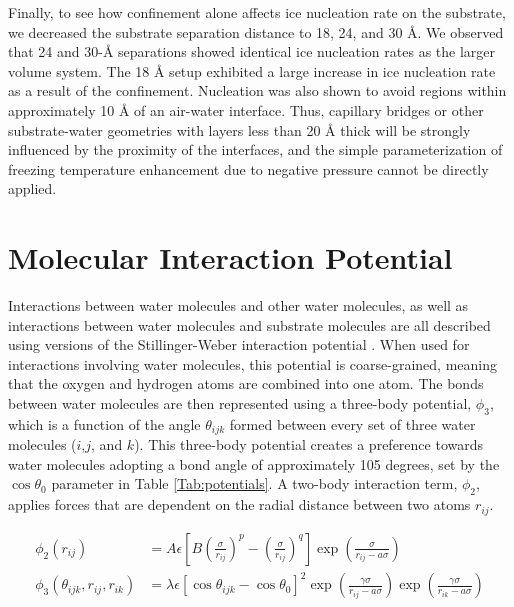 \documentclass[journal abbreviation, manuscript]{copernicus}
\begin{document}
Finally, to see how confinement alone affects ice nucleation rate on the substrate, we decreased the substrate separation distance to 18, 24, and 30 \AA{}. We observed that 24 and 30-\AA{} separations showed identical ice nucleation rates as the larger volume system. The 18 \AA{} setup exhibited a large increase in ice nucleation rate as a result of the confinement. Nucleation was also shown to avoid regions within approximately 10 \AA{} of an air-water interface. Thus, capillary bridges or other substrate-water geometries with layers less than 20 \AA{} thick will be strongly influenced by the proximity of the interfaces, and the simple parameterization of freezing temperature enhancement due to negative pressure cannot be directly applied.


\appendix
\section{Molecular Interaction Potential}\label{app: potential} 

Interactions between water molecules and other water molecules, as well as interactions between water molecules and substrate molecules are all described using versions of the Stillinger-Weber interaction potential \citep{stillinger1985computer}. When used for interactions involving water molecules, this potential is coarse-grained, meaning that the oxygen and hydrogen atoms are combined into one atom. The bonds between water molecules are then represented using a three-body potential, $\phi_{3}$, which is a function of the angle $\theta_{ijk}$ formed between every set of three water molecules ($i$,$j$, and $k$). This three-body potential creates a preference towards water molecules adopting a bond angle of approximately 105 degrees, set by the $\cos\theta_0$ parameter in Table \ref{Tab:potentials}. A two-body interaction term, $\phi_{2}$, applies forces that are dependent on the radial distance between two atoms $r_{ij}$.

\begin{align}\label{eq:sw-potential}
\phi_{2}(r_{ij}) &= A\epsilon\left[B(\frac{\sigma}{r_{ij}})^{p} - (\frac{\sigma}{r_{ij}})^{q}\right]\exp \left( \frac{\sigma}{r_{ij}-a\sigma}\right)\\
\phi_{3}(\theta_{ijk}, r_{ij}, r_{ik}) &= \lambda\epsilon[\cos\theta_{ijk} - \cos\theta_0]^2 \exp \left(\frac{\gamma\sigma}{r_{ij}-a\sigma}\right) \exp \left(\frac{\gamma\sigma}{r_{ik}-a\sigma}\right)
\end{align}
\end{document}
